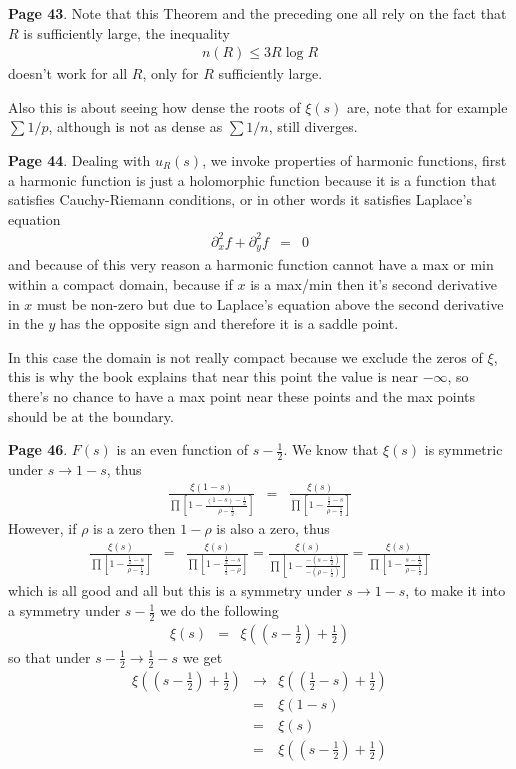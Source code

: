 \documentclass[aps,preprint,preprintnumbers,nofootinbib,showpacs,prd]{revtex4-1}
\newcommand{\nbea}{\begin{eqnarray*}}
\newcommand{\neea}{\end{eqnarray*}}
\begin{document}
{\bf Page 43}. Note that this Theorem and the preceding one all rely on the fact that $R$ is sufficiently large, the inequality
%
\nbea
n(R) \le 3R\log R
\neea
%
doesn't work for all $R$, only for $R$ sufficiently large.

Also this is about seeing how dense the roots of $\xi(s)$ are, note that for example $\sum 1/p$, although is not as dense as $\sum 1/n$, still diverges.

{\bf Page 44}. Dealing with $u_R(s)$, we invoke properties of harmonic functions, first a harmonic function is just a holomorphic function because it is a function that satisfies Cauchy-Riemann conditions, or in other words it satisfies Laplace's equation
%
\nbea
\partial_x^2 f + \partial_y^2 f & = & 0
\neea
%
and because of this very reason a harmonic function cannot have a max or min within a compact domain, because if $x$ is a max/min then it's second derivative in $x$ must be non-zero but due to Laplace's equation above the second derivative in the $y$ has the opposite sign and therefore it is a saddle point.

In this case the domain is not really compact because we exclude the zeros of $\xi$, this is why the book explains that near this point the value is near $-\infty$, so there's no chance to have a max point near these points and the max points should be at the boundary.

{\bf Page 46}. $F(s)$ is an even function of $s - \frac{1}{2}$. We know that $\xi(s)$ is symmetric under $s\to 1-s$, thus
%
\nbea
\frac{\xi(1-s)}{\prod \left \lbrack 1 - \frac{(1-s) - \frac{1}{2}}{\rho - \frac{1}{2}}\right \rbrack} & = & \frac{\xi(s)}{\prod \left \lbrack 1 - \frac{\frac{1}{2}-s}{\rho - \frac{1}{2}}\right \rbrack}
\neea
%
However, if $\rho$ is a zero then $1 - \rho$ is also a zero, thus
%
\nbea
\frac{\xi(s)}{\prod \left \lbrack 1 - \frac{\frac{1}{2}-s}{\rho - \frac{1}{2}}\right \rbrack} & = & \frac{\xi(s)}{\prod \left \lbrack 1 - \frac{\frac{1}{2}-s}{\frac{1}{2} - \rho}\right \rbrack} = \frac{\xi(s)}{\prod \left \lbrack 1 - \frac{-(s - \frac{1}{2})}{-(\rho-\frac{1}{2})}\right \rbrack} = \frac{\xi(s)}{\prod \left \lbrack 1 - \frac{s - \frac{1}{2}}{\rho-\frac{1}{2}}\right \rbrack}
\neea
%
which is all good and all but this is a symmetry under $s\to1-s$, to make it into a symmetry under $s - \frac{1}{2}$ we do the following
%
\nbea
\xi(s) & = & \xi((s - \frac{1}{2}) + \frac{1}{2})
\neea
%
so that under $s - \frac{1}{2} \to \frac{1}{2} - s$ we get
%
\nbea
\xi((s - \frac{1}{2}) + \frac{1}{2}) & \to & \xi((\frac{1}{2} - s) + \frac{1}{2}) \\
& = & \xi(1 - s) \\
& = & \xi(s) \\
& = & \xi((s - \frac{1}{2}) + \frac{1}{2})
\neea
%
\end{document}
